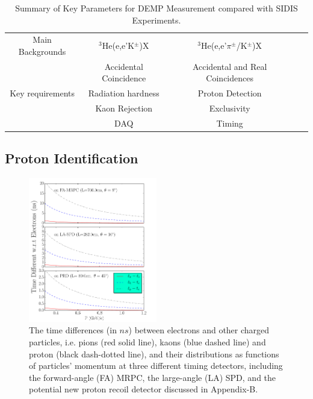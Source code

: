 \begin{table}
\begin{tabular}{|c|c|c|c|c|}
Main Backgrounds           & $\mathrm{^{3}He}$(e,e'K$^\pm$)X &$\mathrm{^{3}He}$(e,e'$\pi^{\pm}$/K$^\pm$)X  \\
                           &   Accidental Coincidence & Accidental and Real Coincidences \\\hline
Key requirements           &  Radiation hardness      & Proton Detection	\\
                           &  Kaon Rejection          & Exclusivity	\\
                           &  DAQ                     & Timing   \\
                        \hline
\end{tabular}
\caption{\footnotesize{Summary of Key Parameters for DEMP Measurement compared
    with SIDIS Experiments.}}\label{table:program_summary}
\label{table:key_par_sidis_dvcs}
\end{table} 

\newpage
\subsection{Proton Identification}

\begin{figure}[!ht]
 \begin{center}
  \includegraphics[width=0.5\textwidth]{./figures/time_diff.pdf}
   \caption[Time-of-time]{\footnotesize{The time differences (in $ns$) between
       electrons and other charged particles, i.e. pions (red solid line),
       kaons (blue dashed line) and proton (black dash-dotted line), and their
       distributions as functions of particles' momentum at three different
       timing detectors, including the forward-angle (FA) MRPC, the large-angle
       (LA) SPD, and the potential new proton recoil detector discussed in
       Appendix-B.}}
   \label{tof_diff}
 \end{center}
\end{figure}

